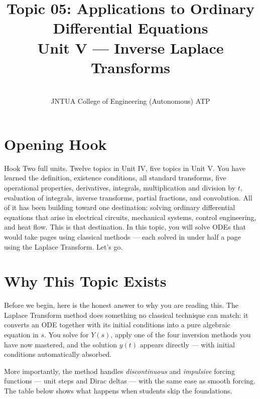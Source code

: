 \documentclass[12pt,a4paper]{article}
\title{Topic 05: Applications to Ordinary Differential Equations \\
       \large Unit V --- Inverse Laplace Transforms}
\author{ \\
        JNTUA College of Engineering (Autonomous) ATP}
\date{}
\begin{document}
\maketitle
\tableofcontents
\newpage

\section{Opening Hook}
\begin{curiositybox}{Hook}
Two full units. Twelve topics in Unit IV, five topics in Unit V. You have learned
the definition, existence conditions, all standard transforms, five operational
properties, derivatives, integrals, multiplication and division by $t$, evaluation
of integrals, inverse transforms, partial fractions, and convolution. All of it has
been building toward one destination: solving ordinary differential equations that
arise in electrical circuits, mechanical systems, control engineering, and heat flow.
This is that destination. In this topic, you will solve ODEs that would take pages
using classical methods --- each solved in under half a page using the Laplace
Transform. Let's go.
\end{curiositybox}

\section{Why This Topic Exists}

Before we begin, here is the honest answer to why you are reading this. The Laplace
Transform method does something no classical technique can match: it converts an ODE
together with its initial conditions into a pure algebraic equation in $s$. You solve
for $Y(s)$, apply one of the four inversion methods you have now mastered, and the
solution $y(t)$ appears directly --- with initial conditions automatically absorbed.

More importantly, the method handles \emph{discontinuous} and \emph{impulsive} forcing
functions --- unit steps and Dirac deltas --- with the same ease as smooth forcing.
The table below shows what happens when students skip the foundations.
\end{document}
